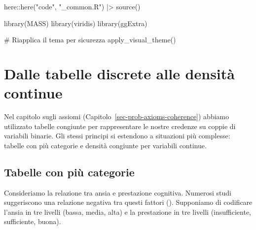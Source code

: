 \documentclass[
  italian,
  letterpaper,
  a4paper,
  11pt,
  open=any]{scrbook}
\newenvironment{Shaded}{\begin{snugshade}}{\end{snugshade}}
\newcommand{\CommentTok}[1]{\textcolor[rgb]{0.37,0.37,0.37}{#1}}
\newcommand{\FunctionTok}[1]{\textcolor[rgb]{0.28,0.35,0.67}{#1}}
\newcommand{\NormalTok}[1]{\textcolor[rgb]{0.00,0.23,0.31}{#1}}
\newcommand{\SpecialCharTok}[1]{\textcolor[rgb]{0.37,0.37,0.37}{#1}}
\newcommand{\StringTok}[1]{\textcolor[rgb]{0.13,0.47,0.30}{#1}}
\theoremstyle{plain}
\theoremstyle{definition}
\theoremstyle{definition}
\theoremstyle{remark}
\begin{document}
\begin{tcolorbox}[enhanced jigsaw, arc=.35mm, bottomrule=.15mm, bottomtitle=1mm, breakable, colback=white, colbacktitle=quarto-callout-caution-color!10!white, colframe=quarto-callout-caution-color-frame, coltitle=black, left=2mm, leftrule=.75mm, opacityback=0, opacitybacktitle=0.6, rightrule=.15mm, title=\textcolor{quarto-callout-caution-color}{\faFire}\hspace{0.5em}{Preparazione del Notebook}, titlerule=0mm, toprule=.15mm, toptitle=1mm]

\begin{Shaded}
\begin{Highlighting}[]
\NormalTok{here}\SpecialCharTok{::}\FunctionTok{here}\NormalTok{(}\StringTok{"code"}\NormalTok{, }\StringTok{"\_common.R"}\NormalTok{) }\SpecialCharTok{|\textgreater{}}
  \FunctionTok{source}\NormalTok{()}

\FunctionTok{library}\NormalTok{(MASS)}
\FunctionTok{library}\NormalTok{(viridis)}
\FunctionTok{library}\NormalTok{(ggExtra)}

\CommentTok{\# Riapplica il tema per sicurezza}
\FunctionTok{apply\_visual\_theme}\NormalTok{()}
\end{Highlighting}
\end{Shaded}

\end{tcolorbox}

\section{Dalle tabelle discrete alle densità
continue}\label{sec-from-discrete-to-continuous}

Nel capitolo sugli assiomi (Capitolo~\ref{sec-prob-axioms-coherence})
abbiamo utilizzato tabelle congiunte per rappresentare le nostre
credenze su coppie di variabili binarie. Gli stessi principi si
estendono a situazioni più complesse: tabelle con più categorie e
densità congiunte per variabili continue.

\subsection{Tabelle con più
categorie}\label{tabelle-con-piuxf9-categorie}

Consideriamo la relazione tra ansia e prestazione cognitiva. Numerosi
studi suggeriscono una relazione negativa tra questi fattori
(). Supponiamo di
codificare l'ansia in tre livelli (bassa, media, alta) e la prestazione
in tre livelli (insufficiente, sufficiente, buona).
\end{document}
